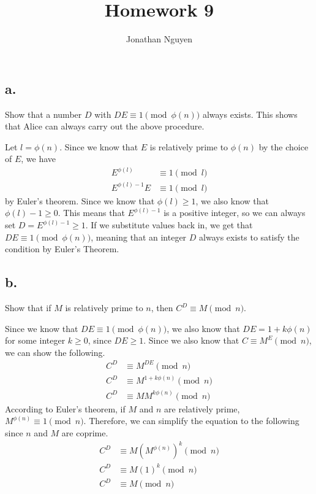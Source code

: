 \documentclass[11pt]{article}
\title{Homework 9}
\author{Jonathan Nguyen}
\begin{document}
\begin{problem}[1]
\subsection*{a.}
Show that a number $D$ with $DE \equiv 1 \pmod{\phi(n)}$ always exists. This shows that Alice can always carry out the above procedure.

\begin{solution}
Let $l = \phi(n)$. Since we know that $E$ is relatively prime to $\phi(n)$ by the choice of $E$, we have
\begin{align*}
    E^{\phi(l)} &\equiv 1 \pmod{l}\\
    E^{\phi(l) - 1}E &\equiv 1 \pmod{l}
\end{align*}
by Euler's theorem. Since we know that $\phi(l) \geq 1$, we also know that $\phi(l) - 1 \geq 0$. This means that $E^{\phi(l) - 1}$ is a positive integer, so we can always set $D = E^{\phi(l) - 1} \geq 1$.
If we substitute values back in, we get that $DE \equiv 1 \pmod{\phi(n)}$, meaning that an integer $D$ always exists to satisfy the condition by Euler's Theorem.
\end{solution}

\subsection*{b.}
Show that if $M$ is relatively prime to $n$, then $C^D \equiv M \pmod{n}$.

\begin{solution}
Since we know that $DE \equiv 1 \pmod{\phi(n)}$, we also know that $DE = 1 + k\phi(n)$ for some integer $k \geq 0$, since $DE \geq 1$.
Since we also know that $C \equiv M^E \pmod{n}$, we can show the following.
\begin{align*}
    C^D &\equiv M^{DE} \pmod{n}\\
    C^D &\equiv M^{1 + k\phi(n)} \pmod{n}\\
    C^D &\equiv MM^{k\phi(n)} \pmod{n}
\end{align*}
According to Euler's theorem, if $M$ and $n$ are relatively prime, $M^{\phi(n)} \equiv 1 \pmod{n}$.
Therefore, we can simplify the equation to the following since $n$ and $M$ are coprime.
\begin{align*}
    C^D &\equiv M(M^{\phi(n)})^k \pmod{n}\\
    C^D &\equiv M(1)^k \pmod{n}\\
    C^D &\equiv M \pmod{n}
\end{align*}
\end{solution}


\end{problem}
\end{document}
